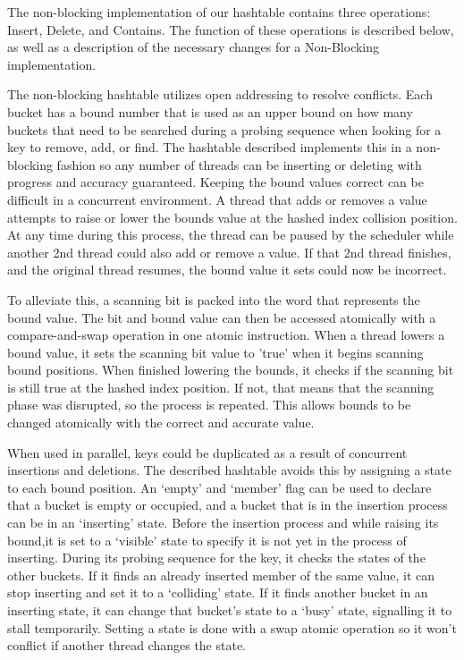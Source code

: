 \documentclass[journal]{IEEEtran}
\begin{document}
The non-blocking implementation of our hashtable contains three operations: Insert, Delete, and Contains. The function of these operations is described below, as well as a description of the necessary changes for a Non-Blocking implementation.

	The non-blocking hashtable utilizes open addressing to resolve conflicts. Each bucket has a bound number that is used as an upper bound on how many buckets that need to be searched during a probing sequence when looking for a key to remove, add, or find. The hashtable described implements this in a non-blocking fashion so any number of threads can be inserting or deleting with progress and accuracy guaranteed.
Keeping the bound values correct can be difficult in a concurrent environment. A thread that adds or removes a value attempts to raise or lower the bounds value at the hashed index collision position. At any time during this process, the thread can be paused by the scheduler while another 2nd thread could also add or remove a value. If that 2nd thread finishes, and the original thread resumes, the bound value it sets could now be incorrect. 

	To alleviate this, a scanning bit is packed into the word that represents the bound value. The bit and bound value can then be accessed atomically with a compare-and-swap operation in one atomic instruction. When a thread lowers a bound value, it sets the scanning bit value to 'true' when it begins scanning bound positions. When finished lowering the bounds, it checks if the scanning bit is still true at the hashed index position. If not, that means that the scanning phase was disrupted, so the process is repeated. This allows bounds to be changed atomically with the correct and accurate value.
	
	When used in parallel, keys could be duplicated as a result of concurrent insertions and deletions. The described hashtable avoids this by assigning a state to each bound position. An ‘empty’ and ‘member’ flag can be used to declare that a bucket is empty or occupied, and a bucket that is in the insertion process can be in an ‘inserting’ state. Before the insertion process and while raising its bound,it is set to a ‘visible’ state to specify it is not yet in the process of inserting. During its probing sequence for the key, it checks the states of the other buckets. If it finds an already inserted member of the same value, it can stop inserting and set it to a ‘colliding’ state. If it finds another bucket in an inserting state, it can change that bucket's state to a ‘busy’ state, signalling it to stall temporarily. Setting a state is done with a swap atomic operation so it won't conflict if another thread changes the state.
	
\end{document}
